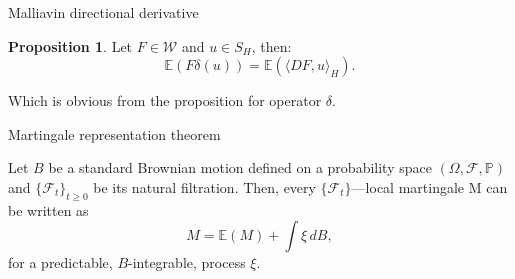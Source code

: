 \documentclass{beamer}%
\theoremstyle{definition}
\newtheorem{proposition}[theorem]{Proposition}
\begin{document}
\begin{frame}{Malliavin directional derivative}
\begin{proposition}
Let $F \in \mathscr{W}$ and $u \in S_H$, then:
$$
\mathbb{E}(F \delta(u)) = \mathbb{E} (\langle DF,u\rangle_H).
$$
\end{proposition}
Which is obvious from the proposition for operator $\delta$.
\end{frame}

\begin{frame}{Martingale representation theorem}
\begin{theorem}
Let $B$ be a standard Brownian motion defined on a probability space ${(\Omega,\mathcal{F},{\mathbb P})}$ and ${\{\mathcal{F}_t\}_{t\ge 0}}$ be its natural filtration.
Then, every ${\{\mathcal{F}_t\}}$---local martingale M can be written as
$$
M = \mathbb{E}(M) + \int\xi\,dB,
$$ 
for a predictable, $B$-integrable, process ${\xi}$.
\end{theorem}
\end{frame}
\end{document}
